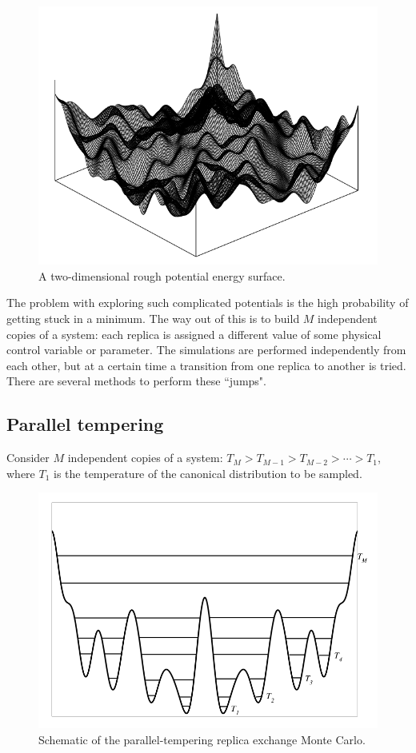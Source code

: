 \begin{figure}[H]
		\centering
		\includegraphics[scale=0.5]{rough}
		\caption{A two-dimensional rough potential energy surface.}
		\label{fig:rough}
	\end{figure}

The problem with exploring such complicated potentials is the high probability of getting stuck in a minimum.
The way out of this is to build $M$ independent copies of a system: each replica is assigned a different value of some physical control variable or parameter.
The simulations are performed independently from each other, but at a certain time a transition from one replica to another is tried.
There are several methods to perform these ``jumps".

	\subsection{Parallel tempering}
	Consider $M$ independent copies of a system: $T_M>T_{M-1}>T_{M-2}>\cdots>T_1$, where $T_1$ is the temperature of the canonical distribution to be sampled.

	\begin{figure}[H]
		\centering
		\includegraphics[scale=0.5]{RE}
		\caption{Schematic of the parallel-tempering replica exchange Monte Carlo.}
		\label{fig:RE}
	\end{figure}

